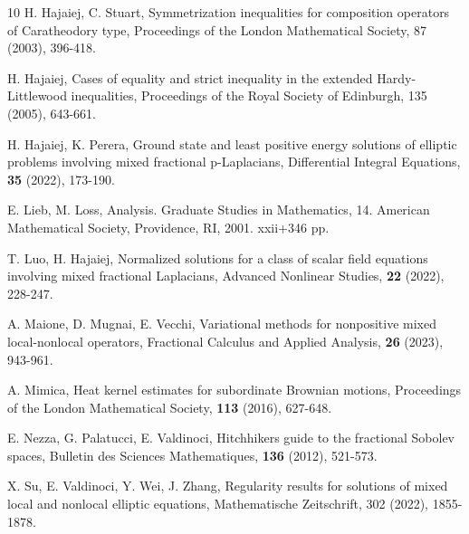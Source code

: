 \documentclass[12pt,a4paper,reqno]{amsart}
\numberwithin{equation}{section}
\begin{document}
\begin{thebibliography}{10}
H. Hajaiej,  C. Stuart,
Symmetrization inequalities for composition operators of Caratheodory type,
Proceedings of the London Mathematical Society,
87 (2003), 396-418.

H. Hajaiej,
Cases of equality and strict inequality in the extended Hardy-Littlewood inequalities,
Proceedings of the Royal Society of Edinburgh, 135 (2005), 643-661.

H. Hajaiej, K. Perera,
{Ground state and least positive energy solutions of elliptic problems involving mixed fractional p-Laplacians},
Differential Integral Equations, \textbf{35} (2022), 173-190.






E. Lieb, M. Loss,
{Analysis}. Graduate Studies in Mathematics, 14. American Mathematical Society, Providence, RI, 2001. xxii+346 pp.

T. Luo, H. Hajaiej,
{Normalized solutions for a class of scalar field equations involving mixed fractional Laplacians},
Advanced Nonlinear Studies,
\textbf{22} (2022), 228-247.

A. Maione, D. Mugnai, E. Vecchi, {Variational methods for nonpositive mixed local-nonlocal operators},
Fractional Calculus and Applied Analysis, \textbf{26} (2023), 943-961.

A. Mimica,
{Heat kernel estimates for subordinate Brownian motions},
Proceedings of the London Mathematical Society,
\textbf{113} (2016), 627-648.


E. Nezza, G. Palatucci, E. Valdinoci,
{Hitchhikers guide to the fractional Sobolev spaces},
Bulletin des Sciences Mathematiques,
\textbf{136} (2012), 521-573.

X. Su, E. Valdinoci, Y. Wei, J. Zhang,
Regularity results for solutions of mixed local and nonlocal elliptic equations,
Mathematische Zeitschrift, 302 (2022), 1855-1878.


\end{thebibliography}
\end{document}
